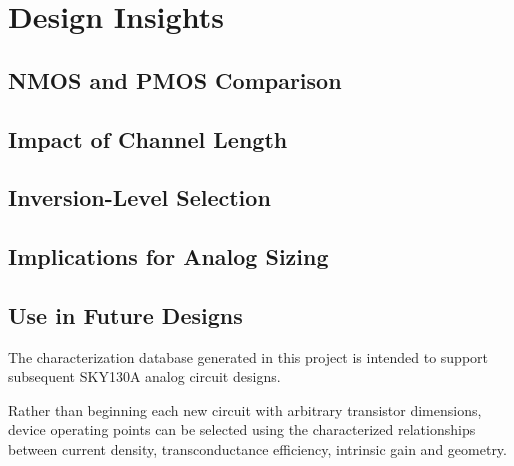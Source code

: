 
\section{Design Insights}
\label{sec:design_insights}

\subsection{NMOS and PMOS Comparison}



\subsection{Impact of Channel Length}



\subsection{Inversion-Level Selection}



\subsection{Implications for Analog Sizing}



\subsection{Use in Future Designs}

The characterization database generated in this project is intended
to support subsequent SKY130A analog circuit designs.

Rather than beginning each new circuit with arbitrary transistor
dimensions, device operating points can be selected using the
characterized relationships between current density, transconductance
efficiency, intrinsic gain and geometry.
